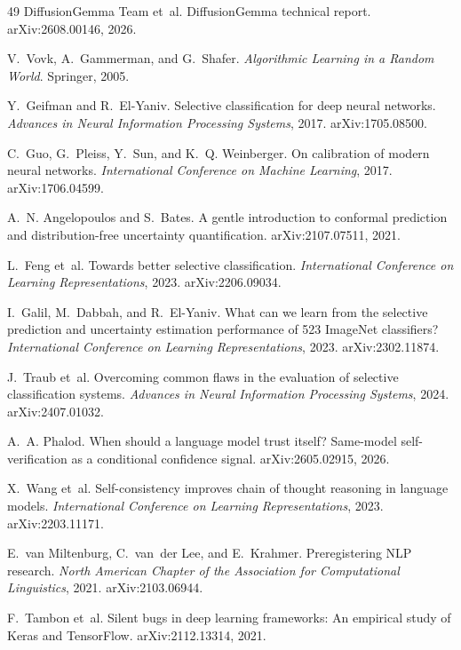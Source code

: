 \documentclass[10pt,a4paper]{article}
\begin{document}
\begin{thebibliography}{49}
DiffusionGemma Team et~al.
DiffusionGemma technical report.
arXiv:2608.00146, 2026.

V.~Vovk, A.~Gammerman, and G.~Shafer.
\emph{Algorithmic Learning in a Random World}.
Springer, 2005.

Y.~Geifman and R.~El-Yaniv.
Selective classification for deep neural networks.
\emph{Advances in Neural Information Processing Systems}, 2017.
arXiv:1705.08500.

C.~Guo, G.~Pleiss, Y.~Sun, and K.~Q. Weinberger.
On calibration of modern neural networks.
\emph{International Conference on Machine Learning}, 2017.
arXiv:1706.04599.

A.~N. Angelopoulos and S.~Bates.
A gentle introduction to conformal prediction and distribution-free
uncertainty quantification.
arXiv:2107.07511, 2021.

L.~Feng et~al.
Towards better selective classification.
\emph{International Conference on Learning Representations}, 2023.
arXiv:2206.09034.

I.~Galil, M.~Dabbah, and R.~El-Yaniv.
What can we learn from the selective prediction and uncertainty estimation
performance of 523 ImageNet classifiers?
\emph{International Conference on Learning Representations}, 2023.
arXiv:2302.11874.

J.~Traub et~al.
Overcoming common flaws in the evaluation of selective classification
systems.
\emph{Advances in Neural Information Processing Systems}, 2024.
arXiv:2407.01032.

A.~A. Phalod.
When should a language model trust itself? Same-model self-verification as a
conditional confidence signal.
arXiv:2605.02915, 2026.

X.~Wang et~al.
Self-consistency improves chain of thought reasoning in language models.
\emph{International Conference on Learning Representations}, 2023.
arXiv:2203.11171.

E.~van Miltenburg, C.~van~der Lee, and E.~Krahmer.
Preregistering NLP research.
\emph{North American Chapter of the Association for Computational
Linguistics}, 2021.
arXiv:2103.06944.

F.~Tambon et~al.
Silent bugs in deep learning frameworks: An empirical study of Keras and
TensorFlow.
arXiv:2112.13314, 2021.

\end{thebibliography}
\end{document}
